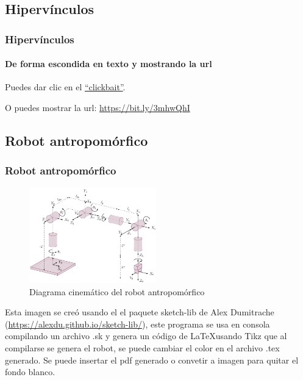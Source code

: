 	\begin{frame}
		\section{Hipervínculos}
		\frametitle{Hipervínculos}
		\framesubtitle{De forma escondida en texto y mostrando la url}
		
		Puedes dar clic en el \href{https://bit.ly/3mhwQhI}{``clickbait''}.
		\vspace{25mm}
		
		O puedes mostrar la url: \url{https://bit.ly/3mhwQhI}
		
	\end{frame}
	\begin{frame}
		\section{Robot antropomórfico}
		\frametitle{Robot antropomórfico}
		\begin{minipage}{\textwidth}
			\begin{minipage}{0.5\textwidth}
				\begin{figure}[!ht]
					\centering
					\includegraphics[width=55mm]{images/antro2}
					\caption{Diagrama cinemático del robot antropomórfico}
				\end{figure}
			\end{minipage}
			\quad
			\begin{minipage}{0.45\textwidth}
				Esta imagen se creó usando el el paquete sketch-lib de Alex Dumitrache (\url{https://alexdu.github.io/sketch-lib/}), este programa se usa en consola compilando un archivo .sk y genera un código de \LaTeX usando Tikz que al compilarse se genera el robot, se puede cambiar el color en el archivo .tex generado. Se puede insertar el pdf generado o convetir a imagen para quitar el fondo blanco.
			\end{minipage}
		\end{minipage}
	\end{frame}
